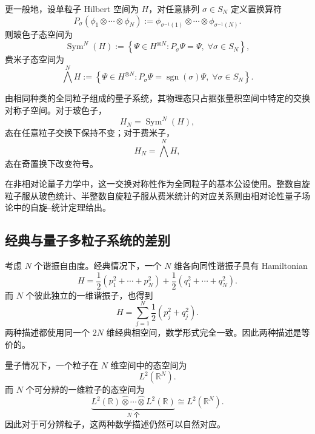\documentclass[UTF8,a4paper,11pt,openany]{ctexbook}
\begin{document}
更一般地，设单粒子 Hilbert 空间为 $H$，对任意排列
$\sigma\in S_N$ 定义置换算符
\begin{equation}
    P_\sigma
    (\phi_1\otimes\cdots\otimes\phi_N)
    :=
    \phi_{\sigma^{-1}(1)}
    \otimes\cdots\otimes
    \phi_{\sigma^{-1}(N)}.
\end{equation}
则玻色子态空间为
\begin{equation}
    \operatorname{Sym}^N(H)
    :=
    \left\{
        \Psi\in H^{\otimes N}:
        P_\sigma\Psi=\Psi,\;
        \forall\sigma\in S_N
    \right\},
\end{equation}
费米子态空间为
\begin{equation}
    \bigwedge^N H
    :=
    \left\{
        \Psi\in H^{\otimes N}:
        P_\sigma\Psi
        =
        \operatorname{sgn}(\sigma)\Psi,\;
        \forall\sigma\in S_N
    \right\}.
\end{equation}

\begin{proposition}
由相同种类的全同粒子组成的量子系统，其物理态只占据张量积空间中特定的交换对称子空间。对于玻色子，
\[
H_N
=
\operatorname{Sym}^N(H),
\]
态在任意粒子交换下保持不变；对于费米子，
\[
H_N
=
\bigwedge^N H,
\]
态在奇置换下改变符号。

在非相对论量子力学中，这一交换对称性作为全同粒子的基本公设使用。整数自旋粒子服从玻色统计、半整数自旋粒子服从费米统计的对应关系则由相对论性量子场论中的自旋--统计定理给出。
\end{proposition}

\subsection{经典与量子多粒子系统的差别}

考虑 $N$ 个谐振自由度。经典情况下，一个 $N$ 维各向同性谐振子具有 Hamiltonian
\begin{equation}
    H
    =
    \frac12
    \left(
        p_1^2+\cdots+p_N^2
    \right)
    +
    \frac12
    \left(
        q_1^2+\cdots+q_N^2
    \right).
\end{equation}
而 $N$ 个彼此独立的一维谐振子，也得到
\begin{equation}
    H
    =
    \sum_{j=1}^{N}
    \frac12
    \left(
        p_j^2+q_j^2
    \right).
\end{equation}
两种描述都使用同一个 $2N$ 维经典相空间，数学形式完全一致。因此两种描述是等价的。

量子情况下，一个粒子在 $N$ 维空间中的态空间为
\begin{equation}
    L^2(\mathbb R^N).
\end{equation}
而 $N$ 个可分辨的一维粒子的态空间为
\begin{equation}
    \underbrace{
        L^2(\mathbb R)
        \widehat{\otimes}\cdots\widehat{\otimes}
        L^2(\mathbb R)
    }_{N\text{ 个}}
    \cong
    L^2(\mathbb R^N).
\end{equation}
因此对于可分辨粒子，这两种数学描述仍然可以自然对应。
\end{document}
